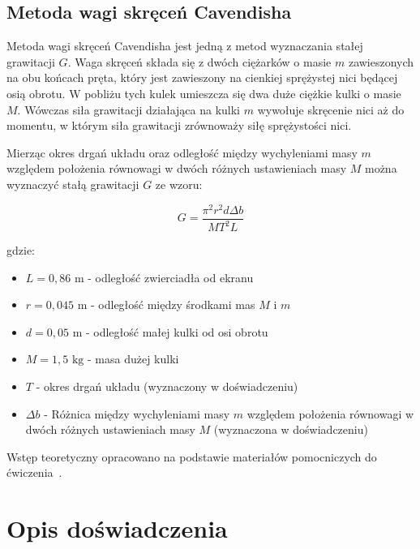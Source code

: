 \documentclass[a4paper,12pt]{article}
\begin{document}
\subsection*{Metoda wagi skręceń Cavendisha}

Metoda wagi skręceń Cavendisha jest jedną z metod wyznaczania stałej grawitacji $G$. Waga skręceń składa się z dwóch ciężarków o masie $m$ zawieszonych na obu końcach pręta, który jest zawieszony na cienkiej sprężystej nici będącej osią obrotu. W pobliżu tych kulek umieszcza się dwa duże ciężkie kulki o masie $M$. Wówczas siła grawitacji działająca na kulki $m$ wywołuje skręcenie nici aż do momentu, w którym siła grawitacji zrównoważy siłę sprężystości nici.

Mierząc okres drgań układu oraz odległość między wychyleniami masy $m$ względem położenia równowagi w dwóch różnych ustawieniach masy $M$ można wyznaczyć stałą grawitacji $G$ ze wzoru:

\begin{equation}
    \label{eq:g_cavendish}
    G = \frac{\pi^2 r^2 d \Delta b}{MT^2 L}
\end{equation}

gdzie:
\begin{itemize}
    \setlength{\itemsep}{0em}
    \item $L = 0,86\text{ m}$ - odległość zwierciadła od ekranu
    \item $r = 0,045\text{ m}$ - odległość między środkami mas $M$ i $m$
    \item $d = 0,05\text{ m}$ - odległość małej kulki od osi obrotu
    \item $M = 1,5\text{ kg}$ - masa dużej kulki
    \item $T$ - okres drgań układu (wyznaczony w doświadczeniu)
    \item $\Delta b$ - Różnica między wychyleniami masy $m$ względem położenia równowagi w dwóch różnych ustawieniach masy $M$ (wyznaczona w doświadczeniu)
\end{itemize}


Wstęp teoretyczny opracowano na podstawie materiałów pomocniczych do ćwiczenia~\cite{materialy_pomoc_19}.


\section{Opis doświadczenia}
\end{document}

